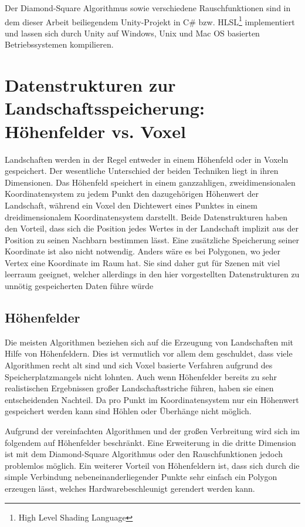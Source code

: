Der Diamond-Square Algorithmus sowie verschiedene Rauschfunktionen sind in dem dieser Arbeit beiliegendem Unity-Projekt in C\# bzw. HLSL\footnote{High Level Shading Language} implementiert und lassen sich durch Unity auf Windows, Unix und Mac OS basierten Betriebssystemen kompilieren.

\section{Datenstrukturen zur Landschaftsspeicherung: Höhenfelder vs. Voxel}
Landschaften werden in der Regel entweder in einem Höhenfeld oder in Voxeln gespeichert.
Der wesentliche Unterschied der beiden Techniken liegt in ihren Dimensionen. Das Höhenfeld speichert in einem ganzzahligen, zweidimensionalen Koordinatensystem zu jedem Punkt den dazugehörigen Höhenwert der Landschaft, während ein Voxel den Dichtewert eines Punktes in einem dreidimensionalem Koordinatensystem darstellt. Beide Datenstrukturen haben den Vorteil, dass sich die Position jedes Wertes in der Landschaft implizit aus der Position zu seinen Nachbarn bestimmen lässt. Eine zusätzliche Speicherung seiner Koordinate ist also nicht notwendig. Anders wäre es bei Polygonen, wo jeder Vertex eine Koordinate im Raum hat. Sie sind daher gut für Szenen mit viel leerraum geeignet, welcher allerdings in den hier vorgestellten Datenstrukturen zu unnötig gespeicherten Daten führe würde

\subsection{Höhenfelder}
Die meisten Algorithmen beziehen sich auf die Erzeugung von Landschaften mit Hilfe von Höhenfeldern. Dies ist vermutlich vor allem dem geschuldet, dass viele Algorithmen recht alt sind und sich Voxel basierte Verfahren aufgrund des Speicherplatzmangels nicht lohnten.
Auch wenn Höhenfelder bereits zu sehr realistischen Ergebnissen großer Landschaftsstriche führen, haben sie einen entscheidenden Nachteil. Da pro Punkt im Koordinatensystem nur ein Höhenwert gespeichert werden kann sind Höhlen oder Überhänge nicht möglich.

Aufgrund der vereinfachten Algorithmen und der großen Verbreitung wird sich im folgendem auf Höhenfelder beschränkt. Eine Erweiterung in die dritte Dimension ist mit dem Diamond-Square Algorithmus oder den Rauschfunktionen jedoch problemlos möglich.
Ein weiterer Vorteil von Höhenfeldern ist, dass sich durch die simple Verbindung nebeneinanderliegender Punkte sehr einfach ein Polygon erzeugen lässt, welches Hardwarebeschleunigt gerendert werden kann.

